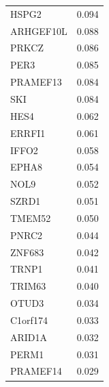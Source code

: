 \documentclass[a4paper,12pt]{article}
\begin{document}
\begin{longtable}{ll}
  HSPG2     & 0.094                                                                                 \\
  ARHGEF10L & 0.088                                                                                 \\
  PRKCZ     & 0.086                                                                                 \\
  PER3      & 0.085                                                                                 \\
  PRAMEF13  & 0.084                                                                                 \\
  SKI       & 0.084                                                                                 \\
  HES4      & 0.062                                                                                 \\
  ERRFI1    & 0.061                                                                                 \\
  IFFO2     & 0.058                                                                                 \\
  EPHA8     & 0.054                                                                                 \\
  NOL9      & 0.052                                                                                 \\
  SZRD1     & 0.051                                                                                 \\
  TMEM52    & 0.050                                                                                 \\
  PNRC2     & 0.044                                                                                 \\
  ZNF683    & 0.042                                                                                 \\
  TRNP1     & 0.041                                                                                 \\
  TRIM63    & 0.040                                                                                 \\
  OTUD3     & 0.034                                                                                 \\
  C1orf174  & 0.033                                                                                 \\
  ARID1A    & 0.032                                                                                 \\
  PERM1     & 0.031                                                                                 \\
  PRAMEF14  & 0.029                                                                                 \\
\end{longtable}
\end{document}
